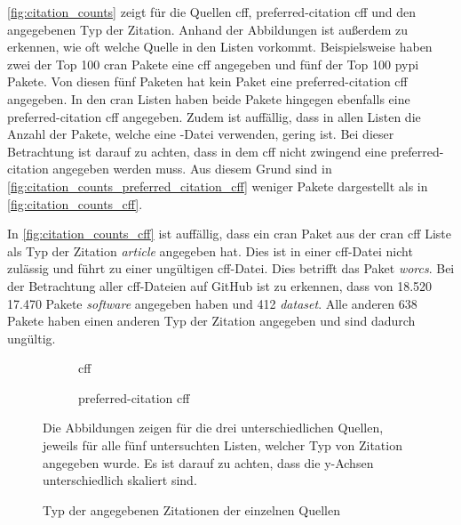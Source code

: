 \autoref{fig:citation_counts} zeigt für die Quellen \gls{cff}, \glqq preferred-citation\grqq{} \gls{cff} und  den angegebenen Typ der Zitation.
Anhand der Abbildungen ist außerdem zu erkennen, wie oft welche Quelle in den Listen vorkommt.
Beispielsweise haben zwei der Top 100 \gls{cran} Pakete eine \gls{cff} angegeben und fünf der Top 100 \gls{pypi} Pakete.
Von diesen fünf Paketen hat kein Paket eine \glqq preferred-citation\grqq{} \gls{cff} angegeben.
In den \gls{cran} Listen haben beide Pakete hingegen ebenfalls eine \glqq preferred-citation\grqq{} \gls{cff} angegeben.
Zudem ist auffällig, dass in allen Listen die Anzahl der Pakete, welche eine -Datei verwenden, gering ist.
Bei dieser Betrachtung ist darauf zu achten, dass in dem \gls{cff} nicht zwingend eine \glqq preferred-citation\grqq{} angegeben werden muss.
Aus diesem Grund sind in \autoref{fig:citation_counts_preferred_citation_cff} weniger Pakete dargestellt als in \autoref{fig:citation_counts_cff}.

In \autoref{fig:citation_counts_cff} ist auffällig, dass ein \gls{cran} Paket aus der \gls{cran} \gls{cff} Liste als Typ der Zitation \emph{article} angegeben hat.
Dies ist in einer \gls{cff}-Datei nicht zulässig und führt zu einer ungültigen \gls{cff}-Datei.
Dies betrifft das Paket \emph{worcs}.
Bei der Betrachtung aller \gls{cff}-Dateien auf GitHub ist zu erkennen, dass von 18.520 17.470 Pakete \emph{software} angegeben haben und 412 \emph{dataset}.
Alle anderen 638 Pakete haben einen anderen Typ der Zitation angegeben und sind dadurch ungültig.

\begin{figure}
    \begin{subfigure}{.5\textwidth}
        \centering
        
        \caption{\gls{cff}}
        \label{fig:citation_counts_cff}
    \end{subfigure}%
    \begin{subfigure}{.5\textwidth}
        \centering
        
        \caption{\glqq preferred-citation\grqq{} \gls{cff}}
        \label{fig:citation_counts_preferred_citation_cff}
    \end{subfigure}
    \begin{center}
        \begin{subfigure}{.5\textwidth}
            \centering
            
            \caption{}
            \label{fig:citation_counts_bib}
        \end{subfigure}
    \end{center}
    \caption{Typ der angegebenen Zitationen der einzelnen Quellen}
    \label{fig:citation_counts}
    \small
    Die Abbildungen zeigen für die drei unterschiedlichen Quellen, jeweils für alle fünf untersuchten Listen, welcher Typ von Zitation angegeben wurde. Es ist darauf zu achten, dass die y-Achsen unterschiedlich skaliert sind.
\end{figure}

